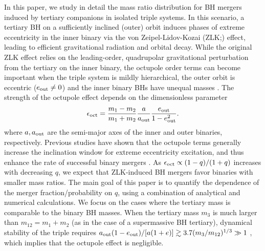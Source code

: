 \documentclass[
        fleqn,
        usenatbib,
    ]{mnras}
\begin{document}
In this paper, we study in detail the mass ratio distribution for BH mergers
induced by tertiary companions in isolated triple systems. In this scenario, a tertiary
BH on a sufficiently inclined (outer) orbit induces phases of extreme
eccentricity in the inner binary via the von Zeipel-Lidov-Kozai
(ZLK;\@\citealp{zeipel, lidov, kozai}) effect, leading to efficient gravitational
radiation and orbital decay.  While the original ZLK effect relies on the
leading-order, quadrupolar gravitational perturbation from the tertiary on the
inner binary, the octupole order terms can become important \citep[sometimes
known as the eccentric Kozai mechanism, e.g.][]{naoz2016eccentric} when the
triple system is mildly hierarchical, the outer orbit is eccentric ($e_{\rm out}
\neq 0$) and the inner binary BHs have unequal masses
\citep[e.g.,][]{ford2000secular, blaes2002kozai, lithwick2011eccentric, LML15}.
The strength of the octupole effect depends on the dimensionless parameter
\begin{align}
    \epsilon_{\rm oct} = \frac{m_1 - m_2}{m_1 + m_2} \frac{a}{a_{\rm out}}
        \frac{e_{\rm out}}{1 - e_{\rm out}^2}.\label{eq:eps_oct}
\end{align}
where $a, a_{\rm out}$ are the semi-major axes of the inner and outer binaries,
respectively. Previous studies have shown that the octupole terms generally
increase the inclination window for extreme eccentricity excitation, and thus
enhance the rate of successful binary mergers \citep{LL18}. As $\epsilon_{\rm
oct} \propto (1-q)/(1+q)$ increases with decreasing $q$, we expect that
ZLK-induced BH mergers favor binaries with smaller mass ratios. The main goal of
this paper is to quantify the dependence of the merger fraction/probability on
$q$, using a combination of analytical and numerical calculations. We focus on
the cases where the tertiary mass is comparable to the binary BH masses. When
the tertiary mass $m_3$ is much larger than $m_{12}=m_1+m_2$ (as in the case of
a supermassive BH tertiary), dynamical stability of the triple requires $a_{\rm
out} (1-e_{\rm out}) /[a(1+e)]  \gtrsim 3.7 (m_3/m_{12})^{1/3} \gg 1$
\citep{kiseleva}, which implies that the octupole effect is negligible.
\end{document}
